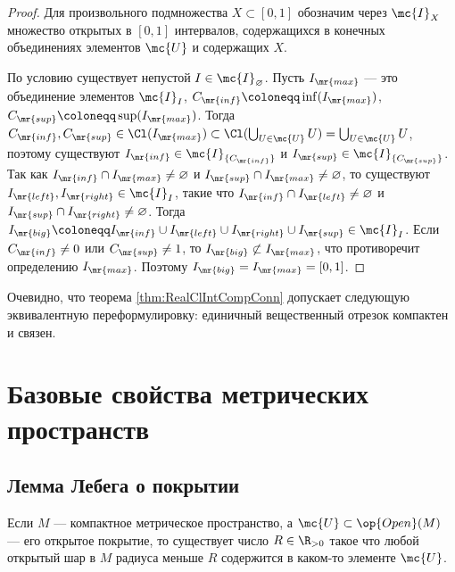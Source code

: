 \documentclass[
	extrafontsizes,
	11pt,
	hyphens,
]{memoir}
\begin{document}
\begin{proof}
Для произвольного подмножества \(X \subset [0,1]\) обозначим через \(\mc{I}_X\) множество открытых в \([0,1]\) интервалов, содержащихся в конечных объединениях элементов \(\mc{U}\) и содержащих \(X\).

По условию существует непустой \(I \in \mc{I}_\varnothing\).
Пусть \(I_\mr{max}\) --- это объединение элементов \(\mc{I}_I\), \(C_\mr{inf} \coloneqq \inf(I_\mr{max})\), \(C_\mr{sup} \coloneqq \sup(I_\mr{max})\).
Тогда \(C_\mr{inf}, C_\mr{sup} \in \Cl(I_\mr{max}) \subset \Cl(\bigcup_{U \in \mc{U}} U) = \bigcup_{U \in \mc{U}} U\),
поэтому существуют \(I_\mr{inf} \in \mc{I}_{\{C_\mr{inf}\}}\) и \(I_\mr{sup} \in \mc{I}_{\{C_\mr{sup}\}}\).
Так как
\(I_\mr{inf} \cap I_\mr{max} \neq \varnothing\) и
\(I_\mr{sup} \cap I_\mr{max} \neq \varnothing\),
то существуют \(I_\mr{left}, I_\mr{right} \in \mc{I}_I\), такие что
\(I_\mr{inf} \cap I_\mr{left} \neq \varnothing\) и
\(I_\mr{sup} \cap I_\mr{right} \neq \varnothing\).
Тогда
\(I_\mr{big} \coloneqq I_\mr{inf} \cup I_\mr{left} \cup I_\mr{right} \cup I_\mr{sup} \in \mc{I}_I\).
Если \(C_\mr{inf} \neq 0\) или \(C_\mr{sup} \neq 1\),
то \(I_\mr{big} \not\subset I_\mr{max}\), что противоречит определению \(I_\mr{max}\).
Поэтому \(I_\mr{big} = I_\mr{max} = [0,1]\).
\end{proof}

\begin{remark}
Очевидно, что теорема \ref{thm:RealClIntCompConn} допускает следующую эквивалентную переформулировку: единичный вещественный отрезок компактен и связен.
\end{remark}




\chapter{Базовые свойства метрических пространств}


\section{Лемма Лебега о покрытии}

\begin{theorem}
Если \(M\) --- компактное метрическое пространство, а \(\mc{U} \subset \op{Open}(M)\) --- его открытое покрытие,%
\label{thm:LebesgueCovering}
то существует число \(R \in \R_{>0}\) такое что любой открытый шар в \(M\) радиуса меньше \(R\) содержится в каком-то элементе \(\mc{U}\).
\end{theorem}
\end{document}
